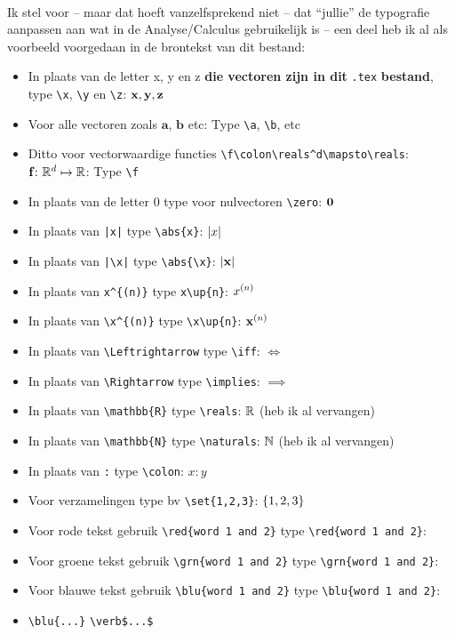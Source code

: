 \documentclass{2wa40summary}
\begin{document}
		\ \\
		Ik stel voor -- maar dat hoeft vanzelfsprekend niet -- dat ``jullie'' de typografie aanpassen aan wat in de Analyse/Calculus gebruikelijk is -- een deel heb ik al als voorbeeld voorgedaan in de brontekst van dit bestand:
		\begin{itemize}
			\item In plaats van de letter x, y en z \textbf{die vectoren zijn in dit} \verb$.tex$ \textbf{bestand}, type
			\verb$\x$, \verb$\y$ en \verb$\z$: ${\textbf{x}}, {\textbf{y}}, {\textbf{z}}$
			\item Voor alle vectoren zoals $\mathbf{a}$, $\mathbf{b}$ etc: Type \verb$\a$, \verb$\b$, etc
			\item Ditto voor vectorwaardige functies \verb$\f\colon\reals^d\mapsto\reals$: ${\textbf{f}}\colon\mathbb{R}^d\mapsto\mathbb{R}$: Type \verb$\f$
			\item In plaats van de letter 0 type voor nulvectoren \verb$\zero$: ${\textbf{0}}$
			\item In plaats van \verb$|x|$ type \verb$\abs{x}$: ${\left|x\right|}$
			\item In plaats van \verb$|\x|$ type \verb$\abs{\x}$: ${\left|{\textbf{x}}\right|}$
			\item In plaats van \verb$x^{(n)}$ type \verb$x\up{n}$: $x^{(n)}$
			\item In plaats van \verb$\x^{(n)}$ type \verb$\x\up{n}$: ${\textbf{x}}^{(n)}$
			\item In plaats van \verb$\Leftrightarrow$ type \verb$\iff$: $\iff$
			\item In plaats van \verb$\Rightarrow$ type \verb$\implies$: $\implies$
			\item In plaats van \verb$\mathbb{R}$ type \verb$\reals$: $\mathbb{R}$ (heb ik al vervangen)
			\item In plaats van \verb$\mathbb{N}$ type \verb$\naturals$: $\mathbb{N}$ (heb ik al vervangen)
			\item In plaats van \verb$:$ type \verb$\colon$: $x\colon y$
			\item Voor verzamelingen type bv \verb$\set{1,2,3}$: $\lbrace1,2,3\rbrace$
			\item Voor rode tekst gebruik \verb$$ type \verb$\red{word 1 and 2}$: \red{word 1 and 2}
			\item Voor groene tekst gebruik \verb$$ type \verb$\grn{word 1 and 2}$: \grn{word 1 and 2}
			\item Voor blauwe tekst gebruik \verb$$ type \verb$\blu{word 1 and 2}$: \blu{word 1 and 2}
			\item {} \verb$\blu{...}$  \verb#\verb$...$# 

\end{itemize}
\end{document}
